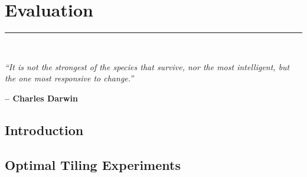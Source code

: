 \graphicspath{{content/chapters/5_evaluation/figures/}}

\chapter{Evaluation}%
\label{chp:evaluation}
\rule{\textwidth}{1pt} \\[1ex]

\epigraph{\textit{``It is not the strongest of the species that survive, nor the most intelligent, but the one most responsive to change.''}}{\textbf{-- Charles Darwin}}

\section{Introduction}
\label{sec:5_introduction}

\section{Optimal Tiling Experiments}
\label{sec:5_tiling_exp}



